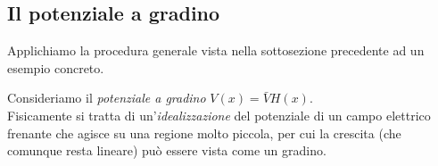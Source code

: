 \documentclass[../../FisicaTeorica.tex]{subfiles}
\begin{document}
\begin{comment}
\textbf{Commento sulle puntate precedenti}\\
Quando avevamo detto:
\[
\cos\left(\frac{2\pi n x}{a}\right)\xrightarrow[\mathcal{S}']{n\to\infty}0
\]
Significa precisamente:
\[
\int dx \cos\left(\frac{2\pi n x}{a}\right) \varphi(x)\xrightarrow[n\to\infty]{}0\quad \forall \varphi \in \mathcal{S}(\bb{R})
\]
(L'idea è che per $n$ molto grande, la fluttuazione è molto frequente, e quindi \textit{in media} la funzione è nulla).\\
Ciò è vero per il \textbf{teorema di\ Riemann-Lebesgue}, per cui una $f\in L'(\bb{R})$ si ha che:
\[
\int dx f(x) e^{ikx}\xrightarrow[n\to\infty]{} 0
\]
(e quindi in particolare è vero per le funzioni nello spazio di Schwartz, dato che $\mathcal{S}(\bb{R})\subset L'(\bb{R})$)
\end{comment}
\subsection{Il potenziale a gradino}
Applichiamo la procedura generale vista nella sottosezione precedente ad un esempio concreto.\\
\begin{center}

\end{center}
Consideriamo il \textit{potenziale a gradino} $V(x)=\bar{V}H(x)$.\\
Fisicamente si tratta di un'\textit{idealizzazione} del potenziale di un campo elettrico frenante che agisce su una regione molto piccola, per cui la crescita (che comunque resta lineare) può essere vista come un gradino.\\
\end{document}
